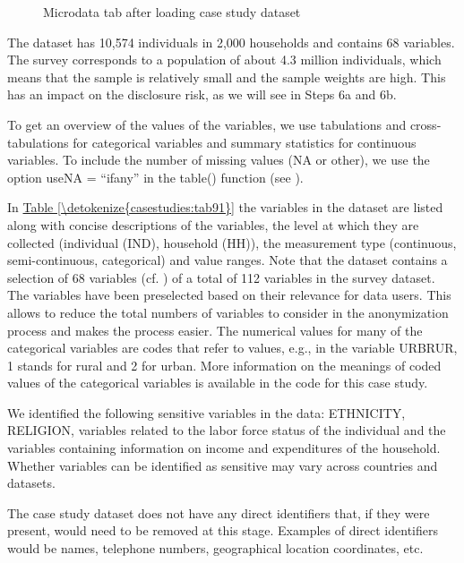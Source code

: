 \documentclass[letterpaper,10pt,english]{sphinxmanual}
\begin{document}
\begin{figure}[htbp]
\centering
\capstart

\noindent{}
\caption{Microdata tab after loading case study dataset}\label{\detokenize{casestudies:fig131}}\label{\detokenize{casestudies:id17}}\end{figure}

The dataset has 10,574 individuals in 2,000 households and contains 68
variables. The survey corresponds to a population of about 4.3 million
individuals, which means that the sample is relatively small and the
sample weights are high. This has an impact on the disclosure risk, as
we will see in Steps 6a and 6b.

To get an overview of the values of the variables, we use tabulations
and cross-tabulations for categorical variables and summary statistics
for continuous variables. To include the number of missing values (NA or
other), we use the option useNA = “ifany” in the table() function (see ).

In \hyperref[\detokenize{casestudies:tab91}]{Table \ref{\detokenize{casestudies:tab91}}} the variables in the dataset are listed along with concise
descriptions of the variables, the level at which they are collected
(individual (IND), household (HH)), the measurement type (continuous,
semi-continuous, categorical) and value ranges. Note that the dataset
contains a selection of 68 variables (cf. ) of a total of 112
variables in the survey dataset. The variables have been preselected
based on their relevance for data users. This allows to reduce the total
numbers of variables to consider in the anonymization process and makes
the process easier. The numerical values for many of the categorical
variables are codes that refer to values, e.g., in the variable URBRUR,
1 stands for rural and 2 for urban. More information on the meanings of
coded values of the categorical variables is available in the  code
for this case study.

We identified the following sensitive variables in the data: ETHNICITY,
RELIGION, variables related to the labor force status of the individual
and the variables containing information on income and expenditures of
the household. Whether variables can be identified as sensitive may vary
across countries and datasets.

The case study dataset does not have any direct identifiers that, if
they were present, would need to be removed at this stage. Examples of
direct identifiers would be names, telephone numbers, geographical
location coordinates, etc.
\end{document}
